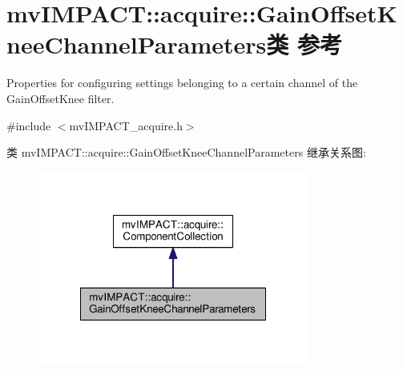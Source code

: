 \hypertarget{classmv_i_m_p_a_c_t_1_1acquire_1_1_gain_offset_knee_channel_parameters}{\section{mv\+I\+M\+P\+A\+C\+T\+:\+:acquire\+:\+:Gain\+Offset\+Knee\+Channel\+Parameters类 参考}
\label{classmv_i_m_p_a_c_t_1_1acquire_1_1_gain_offset_knee_channel_parameters}
}


Properties for configuring settings belonging to a certain channel of the Gain\+Offset\+Knee filter.  




{\ttfamily \#include $<$mv\+I\+M\+P\+A\+C\+T\+\_\+acquire.\+h$>$}



类 mv\+I\+M\+P\+A\+C\+T\+:\+:acquire\+:\+:Gain\+Offset\+Knee\+Channel\+Parameters 继承关系图\+:
\nopagebreak
\begin{figure}[H]
\begin{center}
\leavevmode
\includegraphics[width=252pt]{classmv_i_m_p_a_c_t_1_1acquire_1_1_gain_offset_knee_channel_parameters__inherit__graph}
\end{center}
\end{figure}


